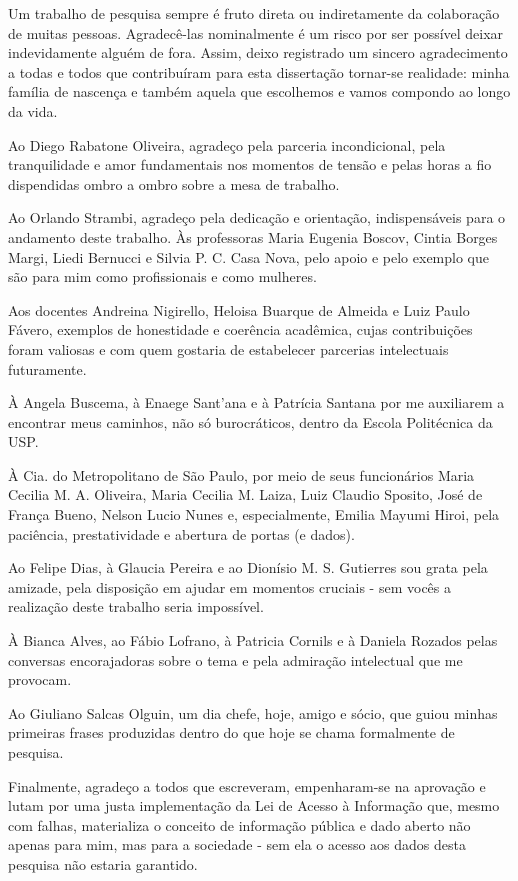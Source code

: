 \documentclass[
  12pt,        %
  openright,      %
  twoside,      %
  a4paper,      %
  english,      %
  brazil        %
]{abntex2}
\begin{document}
\begin{agradecimentos} 
Um trabalho de pesquisa sempre é fruto direta ou indiretamente da colaboração de muitas pessoas.
Agradecê-las nominalmente é um risco por ser possível deixar indevidamente alguém de fora.
Assim, deixo registrado um sincero agradecimento a todas e todos que contribuíram para esta dissertação tornar-se realidade: minha família de nascença e também aquela que escolhemos e vamos compondo ao longo da vida.

Ao Diego Rabatone Oliveira, agradeço pela parceria incondicional, pela tranquilidade e amor fundamentais nos momentos de tensão e pelas horas a fio dispendidas ombro a ombro sobre a mesa de trabalho. 

Ao Orlando Strambi, agradeço pela dedicação e orientação, indispensáveis para o andamento deste trabalho. Às professoras Maria Eugenia Boscov, Cintia Borges Margi, Liedi Bernucci e Silvia P. C. Casa Nova, pelo apoio e pelo exemplo que são para mim como profissionais e como mulheres.

Aos docentes Andreina Nigirello, Heloisa Buarque de Almeida e Luiz Paulo Fávero, exemplos de honestidade e coerência acadêmica, cujas contribuições foram valiosas e com quem gostaria de estabelecer parcerias intelectuais futuramente.

À Angela Buscema, à Enaege Sant'ana e à Patrícia Santana por me auxiliarem a encontrar meus caminhos, não só burocráticos, dentro da Escola Politécnica da USP.

À Cia. do Metropolitano de São Paulo, por meio de seus funcionários Maria Cecilia M. A.  Oliveira, Maria Cecilia M. Laiza, Luiz Claudio Sposito, José de França Bueno, Nelson Lucio Nunes e, especialmente, Emilia Mayumi Hiroi, pela paciência, prestatividade e abertura de portas (e dados).

Ao Felipe Dias, à Glaucia Pereira e ao Dionísio M. S. Gutierres sou grata pela amizade, pela disposição em ajudar em momentos cruciais - sem vocês a realização deste trabalho seria impossível.

À Bianca Alves, ao Fábio Lofrano, à Patricia Cornils e à Daniela Rozados pelas conversas encorajadoras sobre o tema e pela admiração intelectual que me provocam.

Ao Giuliano Salcas Olguin, um dia chefe, hoje, amigo e sócio, que guiou minhas primeiras frases produzidas dentro do que hoje se chama formalmente de pesquisa.

Finalmente, agradeço a todos que escreveram, empenharam-se na aprovação e lutam por uma justa implementação da Lei de Acesso à Informação que, mesmo com falhas, materializa o conceito de informação pública e dado aberto não apenas para mim, mas para a sociedade - sem ela o acesso aos dados desta pesquisa não estaria garantido. 

\end{agradecimentos}
\end{document}
